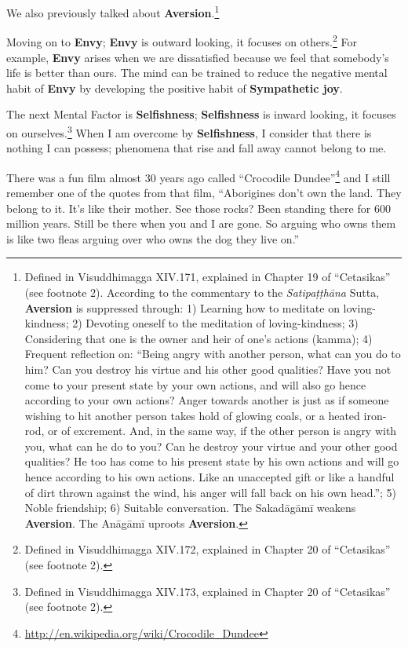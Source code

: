 We also previously talked about \textbf{Aversion}.\footnote{Defined in Visuddhimagga XIV.171, explained in Chapter 19 of “Cetasikas” (see footnote 2). According to the commentary to the \textit{Satipaṭṭhāna} Sutta, \textbf{Aversion} is suppressed through: 1) Learning how to meditate on loving-kindness; 2) Devoting oneself to the meditation of loving-kindness; 3) Considering that one is the owner and heir of one’s actions (kamma); 4) Frequent reflection on: “Being angry with another person, what can you do to him? Can you destroy his virtue and his other good qualities? Have you not come to your present state by your own actions, and will also go hence according to your own actions? Anger towards another is just as if someone wishing to hit another person takes hold of glowing coals, or a heated iron-rod, or of excrement. And, in the same way, if the other person is angry with you, what can he do to you? Can he destroy your virtue and your other good qualities? He too has come to his present state by his own actions and will go hence according to his own actions. Like an unaccepted gift or like a handful of dirt thrown against the wind, his anger will fall back on his own head.”; 5) Noble friendship; 6) Suitable conversation. The Sakadāgāmī weakens \textbf{Aversion}. The Anāgāmī uproots \textbf{Aversion}.}

Moving on to \textbf{Envy}; \textbf{Envy} is outward looking, it focuses on others.\footnote{Defined in Visuddhimagga XIV.172, explained in Chapter 20 of “Cetasikas” (see footnote 2).} For example, \textbf{Envy} arises when we are dissatisfied because we feel that somebody’s life is better than ours. The mind can be trained to reduce the negative mental habit of \textbf{Envy} by developing the positive habit of \textbf{Sympathetic joy}.

The next Mental Factor is \textbf{Selfishness}; \textbf{Selfishness} is inward looking, it focuses on ourselves.\footnote{Defined in Visuddhimagga XIV.173, explained in Chapter 20 of “Cetasikas” (see footnote 2).} When I am overcome by \textbf{Selfishness}, I consider that there is nothing I can possess; phenomena that rise and fall away cannot belong to me.

There was a fun film almost 30 years ago called “Crocodile Dundee”\footnote{\url{http://en.wikipedia.org/wiki/Crocodile_Dundee}} and I still remember one of the quotes from that film, “Aborigines don’t own the land. They belong to it. It’s like their mother. See those rocks? Been standing there for 600 million years. Still be there when you and I are gone. So arguing who owns them is like two fleas arguing over who owns the dog they live on.”

